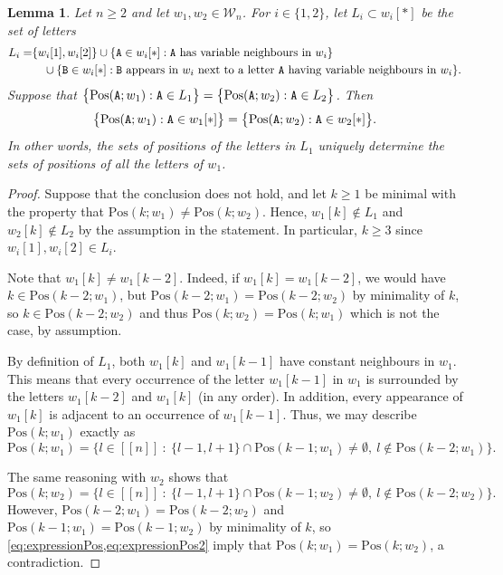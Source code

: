 \documentclass[11pt]{amsart}
\newtheorem{lemma}[theorem]{Lemma}
\theoremstyle{definition}
\renewcommand{\geq}{\geqslant}
\newcommand{\sinterval}[1]{[\![#1]\!] }
\newcommand{\upletters}[1]{{\normalfont{\texttt{#1}}}}
\newcommand{\word}{\mathcal{W}}
\newcommand{\letters}[1]{#1[*]}
\newcommand{\pos}[2]{\mathrm{Pos}(#2; #1)}
\newcommand{\posbis}[2]{\mathrm{Pos}(#2; #1)}
\begin{document}
\begin{lemma}
\label{lem:uniquenesspredict}
Let $n\geq 2$ and let $w_1, w_2\in \word_n$. For $i\in \{1, 2\}$, let $L_i \subset \letters{w_i}$ be the set of letters 
\begin{align*}
L_i = &\{w_i[1], w_i[2]\} \cup \{\upletters{A}\in \letters{w_i} : \upletters{A}\text{ has variable neighbours in }w_i\} \\&\quad \cup \{\upletters{B}\in \letters{w_i} : \upletters{B}\text{ appears in $w_i$ next to a letter }\upletters{A}\text{ having variable neighbours in }w_i\}.
\end{align*}
Suppose that $\big\{ \pos{w_1}{\upletters{A}} : \upletters{A} \in L_1 \big\} = \big\{ \pos{w_2}{\upletters{A}} : \upletters{A} \in L_2 \big\}$. Then
\begin{equation*}
\big\{ \pos{w_1}{\upletters{A}} : \upletters{A} \in \letters{w_1} \big\} = \big\{ \pos{w_2}{\upletters{A}} : \upletters{A} \in \letters{w_2} \big\}.
\end{equation*}
In other words, the sets of positions of the letters in $L_1$ uniquely determine the sets of positions of all the letters of $w_1$.
\end{lemma}
\begin{proof}
Suppose that the conclusion does not hold, and let $k\geq 1$ be minimal with the property that $\posbis{w_1}{k}\neq \posbis{w_2}{k}$. Hence, $w_1[k] \not\in L_1$ and $w_2[k] \not\in L_2$ by the assumption in the statement. In particular, $k\geq 3$ since $w_i[1], w_i[2]\in L_i$. 

Note that $w_1[k]\neq w_1[k-2]$. Indeed, if $w_1[k] = w_1[k-2]$, we would have $k\in \posbis{w_1}{k-2}$, but ${\posbis{w_1}{k-2} = \posbis{w_2}{k-2}}$ by minimality of $k$, so $k\in \posbis{w_2}{k-2}$ and thus $\posbis{w_2}{k} = \posbis{w_1}{k}$ which is not the case, by assumption.

By definition of $L_1$, both $w_1[k]$ and $w_1[k-1]$ have constant neighbours in $w_1$. This means that every occurrence of the letter $w_1[k-1]$ in $w_1$ is surrounded by the letters $w_1[k-2]$ and $w_1[k]$ (in any order). In addition, every appearance of $w_1[k]$ is adjacent to an occurrence of $w_1[k-1]$. Thus, we may describe $\posbis{w_1}{k}$ exactly as
\begin{equation}
\label{eq:expressionPos}
\posbis{w_1}{k} = \big\{l\in \sinterval{n}\  :\  \{l-1, l+1\} \cap \posbis{w_1}{k-1} \neq \emptyset,\  l\not\in \posbis{w_1}{k-2}\big\}.
\end{equation}

The same reasoning with $w_2$ shows that 
\begin{equation}
\label{eq:expressionPos2}
\posbis{w_2}{k} = \big\{l\in \sinterval{n}\  :\  \{l-1, l+1\} \cap \posbis{w_2}{k-1} \neq \emptyset,\  l\not\in \posbis{w_2}{k-2}\big\}.
\end{equation}
However, $\posbis{w_1}{k-2} = \posbis{w_2}{k-2}$ and $\posbis{w_1}{k-1} = \posbis{w_2}{k-1}$ by minimality of $k$, so \cref{eq:expressionPos,eq:expressionPos2} imply that $\posbis{w_1}{k} = \posbis{w_2}{k}$, a contradiction.
\end{proof}
\end{document}

